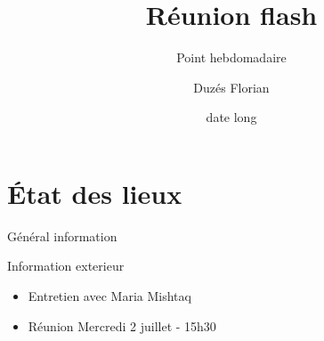 \documentclass[A4,svgnames,9pt,aspectratio=169]{beamer}
\title[titrecourt]{Réunion flash}
\subtitle{Point hebdomadaire}
\date[18/06/2025]{date long}
\author[Duzes Florian]{Duzés Florian}
\begin{document}

\frame{\titlepage}


\renewcommand{\contentsname}{Sommaire}

\frame{\tocpage}


 
\section{État des lieux}
\frame{\sectionpage}

\begin{frame}{Général information}
  \begin{block}{Information exterieur}
    \begin{itemize}
      \item Entretien avec Maria Mishtaq
      \item Réunion Mercredi 2 juillet - 15h30
    \end{itemize}
    
  \end{block}
\end{frame}

\end{document}
